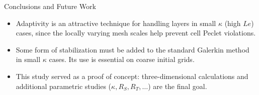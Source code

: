 \documentclass[compress,12pt]{beamer}
\begin{document}
% 



\begin{frame}{Conclusions and Future Work}
  \begin{itemize}

      

    \item Adaptivity is an attractive technique for handling layers in
      small $\kappa$ (high $Le$) cases, since the locally varying mesh
      scales help prevent cell Peclet violations.

    \item Some form of stabilization must be added to the standard Galerkin
      method in small $\kappa$ cases.  Its use is essential on coarse initial grids.

    \item This study served as a proof of concept: three-dimensional calculations
      and additional parametric studies ($\kappa, R_S, R_T, \ldots$) are the final goal.
      
  \end{itemize}
\end{frame}
\end{document}
